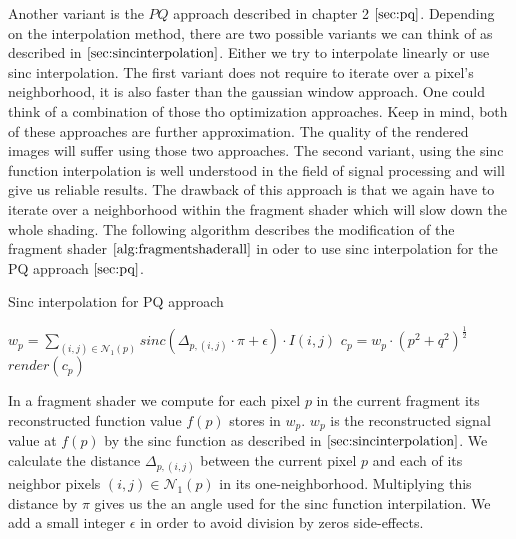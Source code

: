 Another variant is the $PQ$ approach described in chapter 2 $\ref{sec:pq}$. Depending on the interpolation method, there are two possible variants we can think of as described in $\ref{sec:sincinterpolation}$. Either we try to interpolate linearly or use sinc interpolation.
The first variant does not require to iterate over a pixel's neighborhood, it is also faster than the gaussian window approach. One could think of a combination of those tho optimization approaches. Keep in mind, both of these approaches are further approximation. The quality of the rendered images will suffer using those two approaches. The second variant, using the sinc function interpolation is well understood in the field of signal processing and will give us reliable results. The drawback of this approach is that we again have to iterate over a neighborhood within the fragment shader which will slow down the whole shading. The following algorithm describes the modification of the fragment shader  $\ref{alg:fragmentshaderall}$ in oder to use sinc interpolation for the PQ approach $\ref{sec:pq}$.  

\begin{algorithm}[H]
  \caption{Sinc interpolation for PQ approach}
  \begin{algorithmic}
      \State $w_p = \sum_{(i,j) \in \mathcal{N}_{1}(p)} sinc(\Delta_{p,(i,j)} \cdot \pi + \epsilon) \cdot I(i,j)$
      \State $c_p = w_p \cdot (p^2 + q^2)^{\frac{1}{2}}$
      \State $render(c_p)$
    \EndFor
  \end{algorithmic}
  \label{alg:sincinterpolation}
\end{algorithm}

In a fragment shader we compute for each pixel $p$ in the current fragment its reconstructed function value $f(p)$ stores in $w_p$. $w_p$ is the reconstructed signal value at $f(p)$ by the sinc function as described in $\ref{sec:sincinterpolation}$.
We calculate the distance $\Delta_{p,(i,j)}$ between the current pixel $p$ and each of its neighbor pixels $(i,j) \in \mathcal{N}_{1}(p)$ in its one-neighborhood. Multiplying this distance by $\pi$ gives us the an angle used for the sinc function interpilation. We add a small integer $\epsilon$ in order to avoid division by zeros side-effects.

